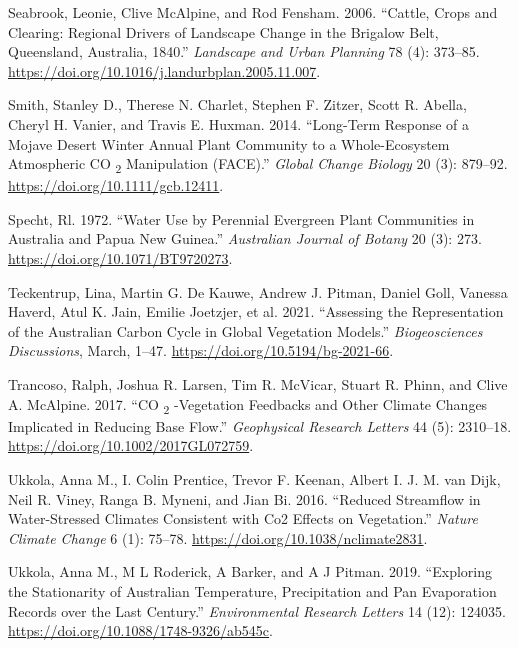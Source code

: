 \documentclass[
]{article}
\newlength{\cslhangindent}
\newlength{\cslentryspacingunit} %
\newenvironment{CSLReferences}[2] %
 {%
  \setlength{\parindent}{0pt}
  \ifodd #1
  \let\oldpar\par
  \def\par{\hangindent=\cslhangindent\oldpar}
  \fi
  \setlength{\parskip}{#2\cslentryspacingunit}
 }%
 {}
\begin{document}
\begin{CSLReferences}{1}{0}
\leavevmode{}%
Seabrook, Leonie, Clive McAlpine, and Rod Fensham. 2006. {``Cattle,
Crops and Clearing: {Regional} Drivers of Landscape Change in the
{Brigalow Belt}, {Queensland}, {Australia}, 1840.''}
\emph{Landscape and Urban Planning} 78 (4): 373--85.
\url{https://doi.org/10.1016/j.landurbplan.2005.11.007}.

\leavevmode{}%
Smith, Stanley D., Therese N. Charlet, Stephen F. Zitzer, Scott R.
Abella, Cheryl H. Vanier, and Travis E. Huxman. 2014. {``Long-Term
Response of a {Mojave Desert} Winter Annual Plant Community to a
Whole-Ecosystem Atmospheric {CO} {\textsubscript{2}} Manipulation
({FACE}).''} \emph{Global Change Biology} 20 (3): 879--92.
\url{https://doi.org/10.1111/gcb.12411}.

\leavevmode{}%
Specht, Rl. 1972. {``Water {Use} by {Perennial Evergreen Plant
Communities} in {Australia} and {Papua New Guinea}.''} \emph{Australian
Journal of Botany} 20 (3): 273. \url{https://doi.org/10.1071/BT9720273}.

\leavevmode{}%
Teckentrup, Lina, Martin G. De Kauwe, Andrew J. Pitman, Daniel Goll,
Vanessa Haverd, Atul K. Jain, Emilie Joetzjer, et al. 2021. {``Assessing
the Representation of the {Australian} Carbon Cycle in Global Vegetation
Models.''} \emph{Biogeosciences Discussions}, March, 1--47.
\url{https://doi.org/10.5194/bg-2021-66}.

\leavevmode{}%
Trancoso, Ralph, Joshua R. Larsen, Tim R. McVicar, Stuart R. Phinn, and
Clive A. McAlpine. 2017. {``{CO} {\textsubscript{2}} -Vegetation
Feedbacks and Other Climate Changes Implicated in Reducing Base Flow.''}
\emph{Geophysical Research Letters} 44 (5): 2310--18.
\url{https://doi.org/10.1002/2017GL072759}.

\leavevmode{}%
Ukkola, Anna M., I. Colin Prentice, Trevor F. Keenan, Albert I. J. M.
van Dijk, Neil R. Viney, Ranga B. Myneni, and Jian Bi. 2016. {``Reduced
Streamflow in Water-Stressed Climates Consistent with {Co2} Effects on
Vegetation.''} \emph{Nature Climate Change} 6 (1): 75--78.
\url{https://doi.org/10.1038/nclimate2831}.

\leavevmode{}%
Ukkola, Anna M., M L Roderick, A Barker, and A J Pitman. 2019.
{``Exploring the Stationarity of {Australian} Temperature, Precipitation
and Pan Evaporation Records over the Last Century.''}
\emph{Environmental Research Letters} 14 (12): 124035.
\url{https://doi.org/10.1088/1748-9326/ab545c}.


\end{CSLReferences}
\end{document}

